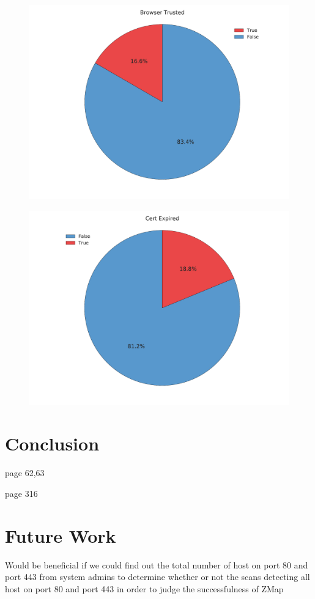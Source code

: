 \documentclass[a4wide,leqno,12pt]{report}
\begin{document}
\begin{figure}[h!]
\includegraphics[scale=.5]{pdf_images/BrowserTrusted}
\end{figure}

\begin{figure}[h!]
\includegraphics[scale=.5]{pdf_images/CertificateExpired}
\end{figure}
\chapter{Conclusion}
\cite{turner2014transport} page 62,63

\cite{mendes2008assessing} page 316
\chapter{Future Work}
Would be beneficial if we could find out the total number of host on port 80 and port 443 from system admins to determine whether or not the scans detecting all host on port 80 and port 443 in order to judge the successfulness of ZMap\\
\end{document}
